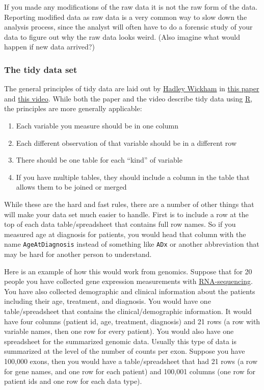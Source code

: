 \documentclass[
]{article}
\providecommand{\tightlist}{%
  \setlength{\itemsep}{0pt}\setlength{\parskip}{0pt}}
\begin{document}
If you made any modifications of the raw data it is not the raw form of
the data. Reporting modified data as raw data is a very common way to
slow down the analysis process, since the analyst will often have to do
a forensic study of your data to figure out why the raw data looks
weird. (Also imagine what would happen if new data arrived?)

\hypertarget{the-tidy-data-set}{%
\subsubsection{The tidy data set}\label{the-tidy-data-set}}

The general principles of tidy data are laid out by
\href{http://had.co.nz/}{Hadley Wickham} in
\href{http://vita.had.co.nz/papers/tidy-data.pdf}{this paper} and
\href{http://vimeo.com/33727555}{this video}. While both the paper and
the video describe tidy data using \href{http://www.r-project.org/}{R},
the principles are more generally applicable:

\begin{enumerate}
\def\labelenumi{\arabic{enumi}.}
\tightlist
\item
  Each variable you measure should be in one column
\item
  Each different observation of that variable should be in a different
  row
\item
  There should be one table for each ``kind'' of variable
\item
  If you have multiple tables, they should include a column in the table
  that allows them to be joined or merged
\end{enumerate}

While these are the hard and fast rules, there are a number of other
things that will make your data set much easier to handle. First is to
include a row at the top of each data table/spreadsheet that contains
full row names. So if you measured age at diagnosis for patients, you
would head that column with the name \texttt{AgeAtDiagnosis} instead of
something like \texttt{ADx} or another abbreviation that may be hard for
another person to understand.

Here is an example of how this would work from genomics. Suppose that
for 20 people you have collected gene expression measurements with
\href{http://en.wikipedia.org/wiki/RNA-Seq}{RNA-sequencing}. You have
also collected demographic and clinical information about the patients
including their age, treatment, and diagnosis. You would have one
table/spreadsheet that contains the clinical/demographic information. It
would have four columns (patient id, age, treatment, diagnosis) and 21
rows (a row with variable names, then one row for every patient). You
would also have one spreadsheet for the summarized genomic data. Usually
this type of data is summarized at the level of the number of counts per
exon. Suppose you have 100,000 exons, then you would have a
table/spreadsheet that had 21 rows (a row for gene names, and one row
for each patient) and 100,001 columns (one row for patient ids and one
row for each data type).
\end{document}
